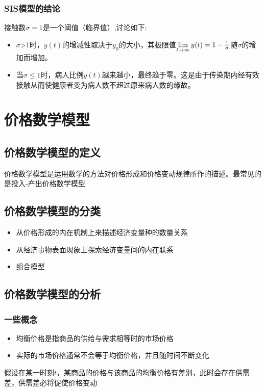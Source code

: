 \documentclass[openany]{progbookcn}
\begin{document}
\subsubsection{SIS模型的结论}
\indent 接触数$\sigma=1$是一个阈值（临界值）,讨论如下:
\begin{itemize}[itemindent=2em]
\item $\sigma$>1时，$y(t)$的增减性取决于$y_0$的大小，其极限值$\mathop{\lim}\limits_{t\to\infty}y(t)=1-{1\over\sigma}$随$\sigma$的增加而增加。
\item 当$\sigma\le 1$时，病人比例$y(t)$越来越小，最终趋于零。这是由于传染期内经有效接触从而使健康者变为病人数不超过原来病人数的缘故。
\end{itemize}

\section{价格数学模型}
\subsection{价格数学模型的定义}
价格数学模型是运用数学的方法对价格形成和价格变动规律所作的描述。最常见的是投入-产出价格数学模型
\subsection{价格数学模型的分类}
\begin{itemize}
\item 从价格形成的内在机制上来描述经济变量种的数量关系
\item 从经济事物表面现象上探索经济变量间的内在联系
\item 组合模型
\end{itemize}
\subsection{价格数学模型的分析}
\subsubsection{一些概念}
\begin{itemize}
\item 均衡价格是指商品的供给与需求相等时的市场价格
\item 实际的市场价格通常不会等于均衡价格，并且随时间不断变化
\end{itemize}
\indent 假设在某一时刻$t$，某商品的价格与该商品的均衡价格有差别，此时会存在供需差，供需差必将促使价格变动
\end{document}
